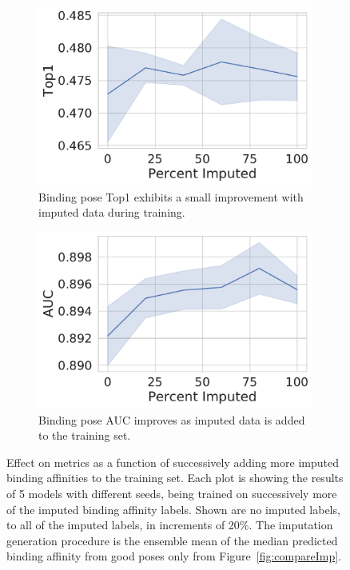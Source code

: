 \documentclass[journal=jmcmar,manuscript=article]{achemso}
\begin{document}
\begin{figure}[tbph]
    \begin{subfigure}[t]{0.48\textwidth}
        \centering
        \includegraphics[width=\linewidth]{figures/MedGOEns_addingImpTop1.pdf}
        \caption{Binding pose Top1 exhibits a small improvement with imputed data during training.}
    \end{subfigure}
    \hfill
    \begin{subfigure}[t]{0.48\textwidth}
        \centering
        \includegraphics[width=\linewidth]{figures/MedGOEns_addingImpAUC.pdf}
        \caption{Binding pose AUC improves as imputed data is added to the training set.}
    \end{subfigure}
    \caption{Effect on metrics as a function of successively adding more imputed binding affinities to the training set. Each plot is showing the results of 5 models with different seeds, being trained on successively more of the imputed binding affinity labels. Shown are no imputed labels, to all of the imputed labels, in increments of 20\%. The imputation generation procedure is the ensemble mean of the median predicted binding affinity from good poses only from Figure~\ref{fig:compareImp}.}
    \label{fig:medGOEnsAdding}
\end{figure}
\end{document}
